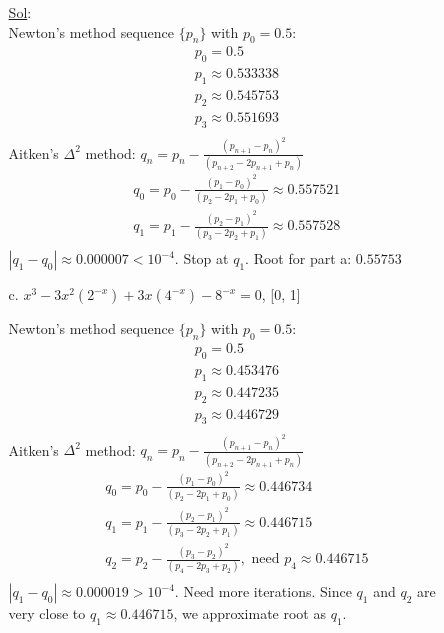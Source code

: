 \begin{enumerate}
\begin{enumerate}
        \underline{Sol}:\\
        Newton's method sequence \( \{p_n\} \) with \( p_0 = 0.5 \):
        \[
          \begin{array}{l}
            p_0 = 0.5 \\
            p_1 \approx 0.533338 \\
            p_2 \approx 0.545753 \\
            p_3 \approx 0.551693 \\
          \end{array}
        \]
        Aitken's \( \Delta^2 \) method: \( q_n = p_n - \frac{(p_{n+1}
        - p_n)^2}{(p_{n+2} - 2p_{n+1} + p_n)} \)
        \[
          \begin{array}{l}
            q_0 = p_0 - \frac{(p_1 - p_0)^2}{(p_2 - 2p_1 + p_0)}
            \approx 0.557521 \\
            q_1 = p_1 - \frac{(p_2 - p_1)^2}{(p_3 - 2p_2 + p_1)}
            \approx 0.557528 \\
          \end{array}
        \]
        \( |q_1 - q_0| \approx 0.000007 < 10^{-4} \). Stop at \( q_1 \).
        Root for part a: \( \boxed{0.55753} \)

      \item[c.] \( x^3 - 3x^2 (2^{-x}) + 3x (4^{-x}) - 8^{-x} = 0 \), [0, 1]

        Newton's method sequence \( \{p_n\} \) with \( p_0 = 0.5 \):
        \[
          \begin{array}{l}
            p_0 = 0.5 \\
            p_1 \approx 0.453476 \\
            p_2 \approx 0.447235 \\
            p_3 \approx 0.446729 \\
          \end{array}
        \]
        Aitken's \( \Delta^2 \) method: \( q_n = p_n - \frac{(p_{n+1}
        - p_n)^2}{(p_{n+2} - 2p_{n+1} + p_n)} \)
        \[
          \begin{array}{l}
            q_0 = p_0 - \frac{(p_1 - p_0)^2}{(p_2 - 2p_1 + p_0)}
            \approx 0.446734 \\
            q_1 = p_1 - \frac{(p_2 - p_1)^2}{(p_3 - 2p_2 + p_1)}
            \approx 0.446715 \\
            q_2 = p_2 - \frac{(p_3 - p_2)^2}{(p_4 - 2p_3 + p_2)},
            \text{ need } p_4 \approx 0.446715 \\
          \end{array}
        \]
        \( |q_1 - q_0| \approx 0.000019 > 10^{-4} \). Need more iterations.
        Since \( q_1 \) and \( q_2 \) are very close to \( q_1
        \approx 0.446715 \), we approximate root as \( q_1 \).


\end{enumerate}
\end{enumerate}
